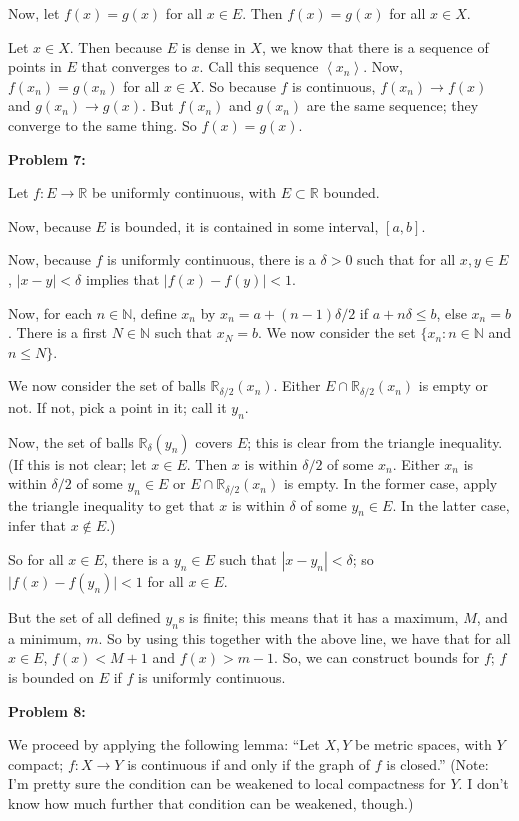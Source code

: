 \documentclass[a4paper,12pt]{article}
\newcommand{\tab}{\hspace{4mm}} %
\newcommand{\shunt}{\vspace{20mm}}
\newcommand{\absval}[1]{\lvert #1 \rvert}
\newcommand{\anbrack}[1]{\left\langle #1 \right\rangle}
\newcommand{\de}{\delta}
\newcommand{\N}{\mathbb{N}}
\newcommand{\R}{\mathbb{R}}
\begin{document}
Now, let $f(x)=g(x)$ for all $x \in E$. Then $f(x)=g(x)$ for all $x \in X$.

\tab Let $x \in X$. Then because $E$ is dense in $X$, we know that there is a sequence of points in $E$ that converges to $x$. Call this sequence $\anbrack{x_n}$. Now, $f(x_n) = g(x_n)$ for all $x \in X$. So because $f$ is continuous, $f(x_n) \to f(x)$ and $g(x_n) \to g(x)$. But $f(x_n)$ and $g(x_n)$ are the same sequence; they converge to the same thing. So $f(x) = g(x)$.

\shunt

{\bf Problem 7:}

Let $f: E \to \R$ be uniformly continuous, with $E \subset \R$ bounded.

Now, because $E$ is bounded, it is contained in some interval, $[a,b]$.

Now, because $f$ is uniformly continuous, there is a $\de >0$ such that for all $x,y \in E$, $|x-y| < \de$ implies that $\absval{f(x)-f(y)} < 1$.

Now, for each $n \in \N$, define $x_n$ by $x_n = a+ (n-1)\de/2$ if $a+n\de \leq b$, else $x_n = b$. There is a first $N \in \N$ such that $x_N = b$. We now consider the set $\{x_n: n \in \N$ and $n \leq N\}$.

We now consider the set of balls $\R_{\de/2}(x_n)$. Either $E \cap \R_{\de /2}(x_n)$ is empty or not. If not, pick a point in it; call it $y_n$.

Now, the set of balls $\R_{\de}(y_n)$ covers $E$; this is clear from the triangle inequality. (If this is not clear; let $x \in E$. Then $x$ is within $\de /2$ of some $x_n$. Either $x_n$ is within $\de /2$ of some $y_n \in E$ or $E \cap \R_{\de /2}(x_n)$ is empty. In the former case, apply the triangle inequality to get that $x$ is within $\de $ of some $y_n \in E$. In the latter case, infer that $x \notin E$.)

So for all $x \in E$, there is a $y_n \in E$ such that $|x-y_n| < \de$; so $\absval{f(x)-f(y_n)} < 1$ for all $x \in E$.

But the set of all defined $y_n$s is finite; this means that it has a maximum, $M$, and a minimum, $m$. So by using this together with the above line, we have that for all $x \in E$, $f(x) < M+1$ and $f(x) > m-1$. So, we can construct bounds for $f$; $f$ is bounded on $E$ if $f$ is uniformly continuous.
\shunt

{\bf Problem 8:}

We proceed by applying the following lemma: ``Let $X, Y$ be metric spaces, with $Y$ compact; $f: X \to Y$ is continuous if and only if the graph of $f$ is closed.'' (Note: I'm pretty sure the condition can be weakened to local compactness for $Y$. I don't know how much further that condition can be weakened, though.)
\end{document}

